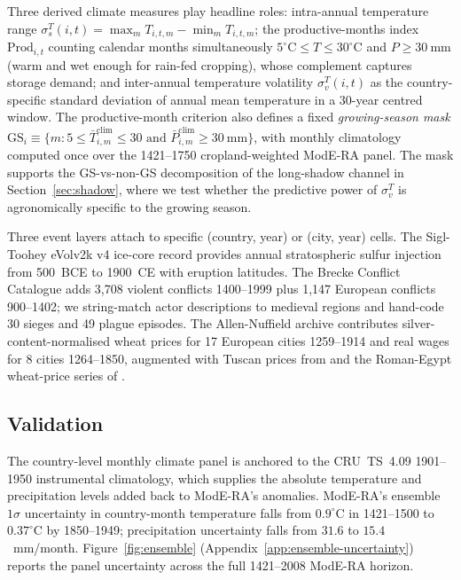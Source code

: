 \documentclass[11pt,letterpaper]{article}
\begin{document}
Three derived climate measures play headline roles: intra-annual temperature range $\sigma_s^T(i,t) = \max_m T_{i,t,m} - \min_m T_{i,t,m}$; the productive-months index $\mathrm{Prod}_{i,t}$ counting calendar months simultaneously $5^\circ\mathrm{C} \le T \le 30^\circ\mathrm{C}$ and $P \ge 30~\mathrm{mm}$ (warm and wet enough for rain-fed cropping), whose complement captures storage demand; and inter-annual temperature volatility $\sigma_v^T(i,t)$ as the country-specific standard deviation of annual mean temperature in a 30-year centred window. The productive-month criterion also defines a fixed \emph{growing-season mask} $\mathrm{GS}_i \equiv \{m : 5{\le} \bar T^{\mathrm{clim}}_{i,m} {\le} 30 \text{ and } \bar P^{\mathrm{clim}}_{i,m} {\ge} 30~\mathrm{mm}\}$, with monthly climatology computed once over the 1421--1750 cropland-weighted ModE-RA panel. The mask supports the GS-vs-non-GS decomposition of the long-shadow channel in Section~\ref{sec:shadow}, where we test whether the predictive power of $\sigma_v^T$ is agronomically specific to the growing season.

Three event layers attach to specific (country, year) or (city, year) cells. The Sigl-Toohey eVolv2k v4 ice-core record \citep{sigl2024evolv2k, toohey2017} provides annual stratospheric sulfur injection from 500~BCE to 1900~CE with eruption latitudes. The Brecke Conflict Catalogue \citep{brecke1999} adds 3{,}708 violent conflicts 1400--1999 plus 1{,}147 European conflicts 900--1402; we string-match actor descriptions to medieval regions and hand-code 30 sieges and 49 plague episodes. The Allen-Nuffield archive \citep{allen2001divergence} contributes silver-content-normalised wheat prices for 17 European cities 1259--1914 and real wages for 8 cities 1264--1850, augmented with Tuscan prices from \citet{malanima2002} and the Roman-Egypt wheat-price series of \citet{harper2016people}.

\subsection{Validation}

The country-level monthly climate panel is anchored to the CRU~TS~4.09 \citep{harris2020cruts} 1901--1950 instrumental climatology, which supplies the absolute temperature and precipitation levels added back to ModE-RA's anomalies. ModE-RA's ensemble $1\sigma$ uncertainty in country-month temperature falls from $0.9^\circ$C in 1421--1500 to $0.37^\circ$C by 1850--1949; precipitation uncertainty falls from $31.6$ to $15.4$~mm/month. Figure~\ref{fig:ensemble} (Appendix~\ref{app:ensemble-uncertainty}) reports the panel uncertainty across the full 1421--2008 ModE-RA horizon.
\end{document}

